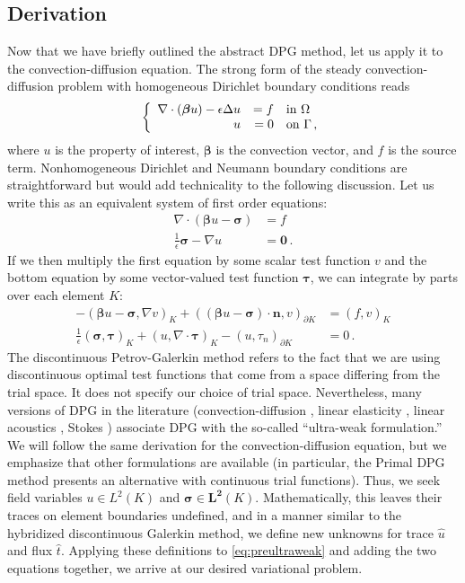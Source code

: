 \documentclass[letterpaper]{article}
\def\btau{\boldsymbol\tau}
\def\bfsigma{\boldsymbol\sigma}
\def\bbeta{\boldsymbol\beta}
\newcommand{\bs}[1]{\boldsymbol{#1}}
\newcommand{\eqnref}[1]{\eqref{eq:#1}}
\newcommand{\mb}[1]{\mathbf{#1}}
\newcommand{\del}{\Delta}
\newcommand{\grad}{\nabla}
\renewcommand{\div}{\grad \cdot}
\begin{document}
\subsection{Derivation}
Now that we have briefly outlined the abstract DPG method, let us apply it to
the convection-diffusion equation. The strong form of the steady
convection-diffusion problem with homogeneous Dirichlet boundary conditions reads
\[
\left\{
\begin{array}[c]{rrl}
\div(\bs\beta u)-\epsilon\del u & =f & \text{in }\Omega\\
u & =0 & \text{on }\Gamma\,,
\end{array}
\right.
\]
where $u$ is the property of interest, $\bs\beta$ is the convection vector,
and $f$ is the source term. Nonhomogeneous Dirichlet and Neumann boundary
conditions are straightforward but would add technicality to the following
discussion. Let us write this as an equivalent system of first
order equations:
\begin{align*}
\div(\bs\beta u-\bs\sigma)&=f\\
\frac{1}{\epsilon}\bs\sigma-\grad u&=\bs0\,.
\end{align*}
If we then multiply the first equation by some scalar test function $v$ and the
bottom equation by some vector-valued test function $\btau$, we can integrate by
parts over each element $K$:
\begin{equation}
\label{eq:preultraweak}
\begin{aligned}
-(\bbeta u-\bfsigma,\nabla v)_K+((\bbeta
u-\bfsigma)\cdot\mathbf{n},v)_{\partial K}&=(f,v)_K\\
\frac{1}{\epsilon}(\bfsigma,\btau)_K+(u,\nabla\cdot\btau)_K
-(u,\tau_n)_{\partial K}&=0\,.
\end{aligned}
\end{equation}
The discontinuous Petrov-Galerkin method refers to the fact that we are using
discontinuous optimal test functions that come from a space differing from the
trial space. It does not specify our choice of trial space. Nevertheless, many
versions of DPG in the literature (convection-diffusion \cite{DPG6},
linear elasticity \cite{BramwellDemkowiczGopalakrishnanQiu11}, linear
acoustics \cite{DemkowiczGopalakrishnanMugaZitelli12}, Stokes
\cite{DPGStokes}) associate DPG with the so-called ``ultra-weak formulation.''
We will follow the same derivation for the convection-diffusion equation, but
we emphasize that other formulations are available (in particular, the
Primal DPG\cite{PrimalDPG} method presents an alternative with
continuous trial functions). Thus, we seek field variables $u\in L^2(K)$ and
$\bfsigma\in\mb{L^2}(K)$. Mathematically, this leaves their traces on element
boundaries undefined, and in a manner similar to the hybridized discontinuous
Galerkin method, we define new unknowns for trace $\hat u$ and flux $\hat t$.
Applying these definitions to \eqnref{preultraweak} and adding the two
equations together, we arrive at our desired variational problem.
\end{document}
